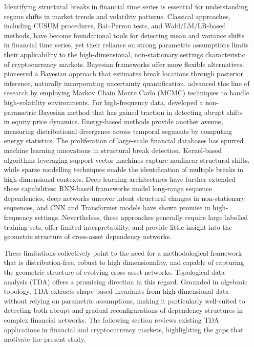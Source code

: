 \documentclass[11pt,reqno]{amsart}
\numberwithin{equation}{section} %
\begin{document}
Identifying structural breaks in financial time series is essential for understanding regime shifts in market trends and volatility patterns\citep{RN6102}.  
Classical approaches, including CUSUM procedures\cite{page1963}, Bai--Perron tests\cite{RN6101}, and Wald/LM/LR-based methods\cite{RN6103}, have become foundational tools for detecting mean and variance shifts in financial time series, yet their reliance on strong parametric assumptions limits their applicability to the high-dimensional, non-stationary settings characteristic of cryptocurrency markets.
Bayesian frameworks offer more flexible alternatives.\citet{RN5973} pioneered a Bayesian approach that estimates break locations through posterior inference, naturally incorporating uncertainty quantification. 
\citet{RN6166} advanced this line of research by employing Markov Chain Monte Carlo (MCMC) techniques to handle high-volatility environments. For high-frequency data, \citet{RN6167} developed a non-parametric Bayesian method that has gained traction in detecting abrupt shifts in equity price dynamics. 
Energy-based methods provide another avenue, measuring distributional divergence across temporal segments by computing energy statistics\cite{RN6106}.
The proliferation of large-scale financial databases has spurred machine learning innovations in structural break detection. 
Kernel-based algorithms leveraging support vector machines capture nonlinear structural shifts\cite{RN6260}, while sparse modelling techniques enable the identification of multiple breaks in high-dimensional contexts\cite{RN6168}. 
Deep learning architectures have further extended these capabilities: RNN-based frameworks model long-range sequence dependencies\cite{RN6280}, deep networks uncover latent structural changes in non-stationary sequences\cite{RN6169,RN6170}, and CNN and Transformer models have shown promise in high-frequency settings\cite{RN6281}. 
Nevertheless, these approaches generally require large labelled training sets, offer limited interpretability, and provide little insight into the geometric structure of cross-asset dependency networks.

These limitations collectively point to the need for a methodological framework that is distribution-free, robust to high dimensionality, and capable of capturing the geometric structure of evolving cross-asset networks. 
Topological data analysis (TDA) offers a promising direction in this regard. 
Grounded in algebraic topology, TDA extracts shape-based invariants from high-dimensional data without relying on parametric assumptions, making it particularly well-suited to detecting both abrupt and gradual reconfigurations of dependency structures in complex financial networks\cite{ravishanker2019topological,RN5499}. 
The following section reviews existing TDA applications in financial and cryptocurrency markets, highlighting the gaps that motivate the present study.
\end{document}
